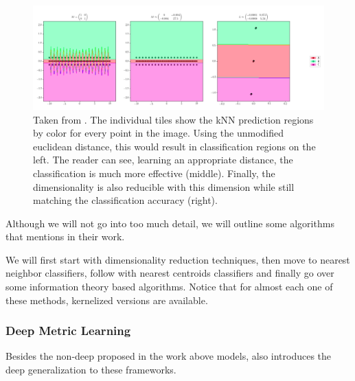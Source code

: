 \documentclass[a4paper,12pt,oneside,openright]{report}
\begin{document}
\begin{figure}[H]
	\center
  \includegraphics[width=\linewidth]{./assets/relatedwork/metric_learning_example.png}
  \caption{Taken from \cite{suarez19}. The individual tiles show the kNN prediction regions by color for every point in the image. Using the unmodified euclidean distance, this would result in classification regions on the left. The reader can see, learning an appropriate distance, the classification is much more effective (middle). Finally, the dimensionality is also reducible with this dimension while still matching the classification accuracy (right).}
\end{figure}

Although we will not go into too much detail, we will outline some algorithms that \cite{suarez19} mentions in their work.

We will first start with dimensionality reduction techniques, then move to nearest neighbor classifiers, follow with nearest centroids classifiers and finally go over some information theory based algorithms.
Notice that for almost each one of these methods, kernelized versions are available.

\subsubsection{Deep Metric Learning}

Besides the non-deep proposed in the work above models, \cite{kaya19} also introduces the deep generalization to these frameworks.
\end{document}
